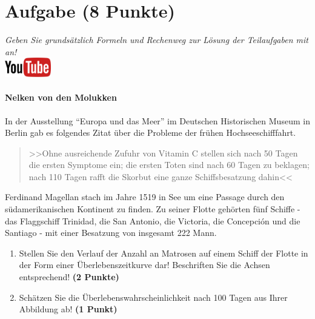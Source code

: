 \documentclass[a4paper, 9pt]{scrartcl}\usepackage[]{graphicx}\usepackage[]{xcolor}
\begin{document}
 
\clearpage

\section{Aufgabe \hfill (8 Punkte)}

\textit{Geben Sie grunds{\"a}tzlich Formeln und Rechenweg zur L{\"o}sung der
  Teilaufgaben mit an!} \\[1Ex]

\hfill\href{https://youtu.be/1B53cVFIU7Q}{\includegraphics[width =
  2cm]{img/youtube}} %
\hspace{2Ex}

\paragraph{Nelken von den Molukken}



In der Ausstellung "`Europa und das Meer"' im Deutschen Historischen Museum in
Berlin gab es folgendes Zitat {\"u}ber die Probleme der fr{\"u}hen Hochseeschifffahrt.

\begin{quote}
  >>Ohne ausreichende Zufuhr von Vitamin C stellen sich nach 50 Tagen die
  ersten Symptome ein; die ersten Toten sind nach 60 Tagen zu beklagen;
  nach 110 Tagen rafft die Skorbut eine ganze Schiffsbesatzung dahin<<
\end{quote}

Ferdinand Magellan stach im Jahre 1519 in See um eine Passage durch den
s{\"u}damerikanischen Kontinent zu finden. Zu seiner Flotte geh{\"o}rten
f{\"u}nf Schiffe - das Flaggschiff Trinidad, die San Antonio, die Victoria, die
Concepci{\'o}n und die Santiago - mit einer Besatzung von insgesamt
222 Mann. 

\begin{enumerate}
\item Stellen Sie den Verlauf der Anzahl an Matrosen auf einem Schiff der
  Flotte in der Form einer {\"U}berlebenszeitkurve dar! Beschriften Sie die
  Achsen entsprechend! \textbf{(2 Punkte)} 
\item Sch{\"a}tzen Sie die {\"U}berlebenswahrscheinlichkeit nach 100 Tagen
  aus Ihrer Abbildung ab! \textbf{(1 Punkt)} 
\end{enumerate}
\end{document}
